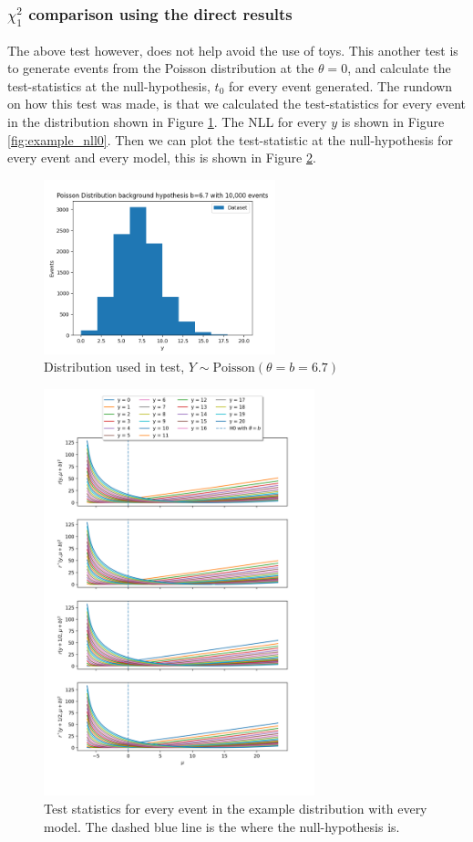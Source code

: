 \documentclass[14pt, a4paper]{article}  %
\begin{document}
\subsubsection{$\chi^2_1$ comparison using the direct results}
The above test however, does not help avoid the use of toys. This another test is to generate events from the Poisson distribution at the $\theta=0$, and calculate the test-statistics at the null-hypothesis, $t_0$ for every event generated. The rundown on how this test was made, is that we calculated the test-statistics for every event in the distribution shown in Figure \ref{fig:example_dist}. The NLL for every $y$ is shown in Figure \ref{fig:example_nll0}. Then we can plot the test-statistic at the null-hypothesis for every event and every model, this is shown in Figure \ref{fig:example_nlls}.
\begin{figure}[!ht]
	\centering
        \includegraphics[width=0.6\textwidth]{Poisson_approximation_b6p7/distribution.png}\caption{Distribution used in test, $Y\sim\text{Poisson}(\theta=b=6.7)$}\label{fig:example_dist}
\end{figure} 
\begin{figure}[!ht]
	\centering
        \includegraphics[width=0.7\textwidth]{Poisson_approximation_b6p7/nlls_event.png}\caption{Test statistics for every event in the example distribution with every model. The dashed blue line is the where the null-hypothesis is.}\label{fig:example_nlls}
\end{figure} 
\end{document}
